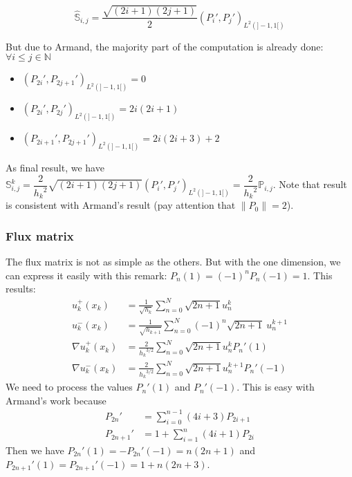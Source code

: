\documentclass[a4paper,10pt,draft]{article}
\begin{document}
\begin{equation*}
 \widehat{\mathbb{S}}_{i,j} = \frac{\sqrt{(2i+1)(2j+1)}}{2} \left( P_i' , P_j' \right)_{L^2(]-1,1[)}
\end{equation*}

But due to Armand, the majority part of the computation is already done: $\forall i\leq j \in 
\mathbb{N}$
\begin{itemize}
 \item $\left(P_{2i}',P_{2j+1}'\right)_{L^2(]-1,1[)} = 0$
 \item $\left(P_{2i}',P_{2j}'\right)_{L^2(]-1,1[)} = 2i(2i+1)$
 \item $\left(P_{2i+1}',P_{2j+1}'\right)_{L^2(]-1,1[)} = 2i(2i+3)+2$
\end{itemize}

As final result, we have $\mathbb{S}_{i,j}^k = \dfrac{2}{{h_k}^2} \sqrt{(2i+1)(2j+1)} \left( P_i' , 
P_j' \right)_{L^2(]-1,1[)} = \dfrac{2}{{h_k}^2} \mathbb{P}_{i,j}$. Note that result is consistent 
with Armand's result (pay attention that $\|P_0\| = 2$).

\subsubsection{Flux matrix}

The flux matrix is not as simple as the others. But with the one dimension, we can express it 
easily with this remark: $P_n(1) = (-1)^n P_n(-1) = 1$. This results:
\begin{align*}
 u^+_k(x_k) &= \frac{1}{\sqrt{h_k}} \sum_{n=0}^N \sqrt{2n+1} u_n^k\\
 u^-_k(x_k) &= \frac{1}{\sqrt{h_{k+1}}} \sum_{n=0}^N (-1)^n \sqrt{2n+1}\ u_n^{k+1}\\
 \nabla u_k^+ (x_k) &= \frac{2}{{h_k}^{3/2}} \sum_{n=0}^N \sqrt{2n+1} u_n^k P_n'(1) \\
 \nabla u_k^- (x_k) &= \frac{2}{{h_k}^{3/2}} \sum_{n=0}^N \sqrt{2n+1} u_n^{k+1} P_n'(-1)
\end{align*}
We need to process the values $P_n'(1)$ and $P_n'(-1)$. This is easy with Armand's work because
\begin{align*}
 P_{2n}' &= \sum_{i=0}^{n-1} (4i+3) P_{2i+1} \\
 P_{2n+1}' &= 1 + \sum_{i=1}^{n} (4i+1) P_{2i}
\end{align*}
Then we have $P_{2n}'(1) = -P_{2n}'(-1) = n(2n+1)$ and $P_{2n+1}'(1) = P_{2n+1}'(-1) = 1 + n(2n+3)$.
\end{document}
